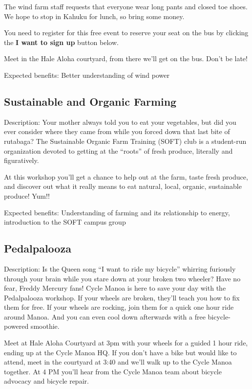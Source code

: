 The wind farm staff requests that everyone wear long pants and closed toe shoes.  We hope to stop in Kahuku for lunch, so bring some money.

You need to register for this free event to reserve your seat on the bus by clicking the \textbf{I want to sign up} button below.

Meet in the Hale Aloha courtyard, from there we'll get on the bus.  Don't be late!

Expected benefits: Better understanding of wind power


\subsection{Sustainable and Organic Farming}

Description: Your mother always told you to eat your vegetables, but did you ever consider where they came from while you forced down that last bite of rutabaga? The Sustainable Organic Farm Training (SOFT) club is a student-run organization devoted to getting at the ``roots'' of fresh produce, literally and figuratively. 

At this workshop you'll get a chance to help out at the farm, taste fresh produce, and discover out what it really means to eat natural, local, organic, sustainable produce! Yum!!

Expected benefits: Understanding of farming and its relationship to energy, introduction to the SOFT campus group


\subsection{Pedalpalooza}

Description: Is the Queen song ``I want to ride my bicycle'' whirring furiously through your brain while you stare down at your broken two wheeler? Have no fear, Freddy Mercury fans! Cycle Manoa is here to save your day with the Pedalpalooza workshop. If your wheels are broken, they'll teach you how to fix them for free. If your wheels are rocking, join them for a quick one hour ride around Manoa. And you can even cool down afterwards with a free bicycle-powered smoothie.

Meet at Hale Aloha Courtyard at 3pm with your wheels for a guided 1 hour ride, ending up at the Cycle Manoa HQ. If you don't have a bike but would like to attend, meet in the courtyard at 3:40 and we'll walk up to the Cycle Manoa together. At 4 PM you'll hear from the Cycle Manoa team about bicycle advocacy and bicycle repair.

